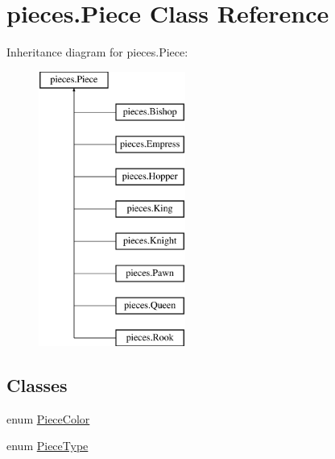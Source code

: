 \hypertarget{classpieces_1_1_piece}{}\section{pieces.\+Piece Class Reference}
\label{classpieces_1_1_piece}
Inheritance diagram for pieces.\+Piece\+:\begin{figure}[H]
\begin{center}
\leavevmode
\includegraphics[height=9.000000cm]{classpieces_1_1_piece}
\end{center}
\end{figure}
\subsection*{Classes}
\begin{DoxyCompactItemize}
\item 
enum \mbox{\hyperlink{enumpieces_1_1_piece_1_1_piece_color}{Piece\+Color}}
\item 
enum \mbox{\hyperlink{enumpieces_1_1_piece_1_1_piece_type}{Piece\+Type}}
\end{DoxyCompactItemize}
